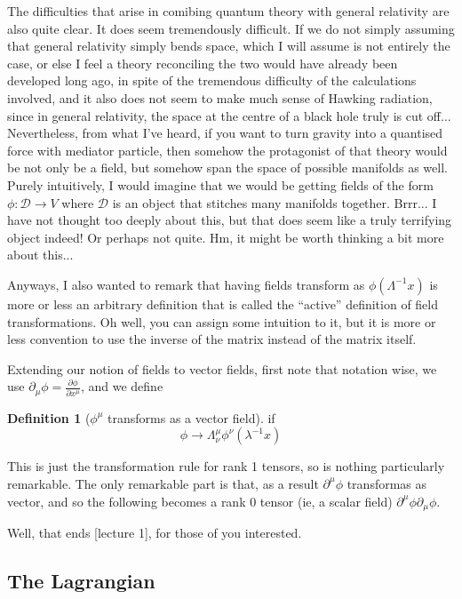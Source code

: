 \documentclass{article}
\theoremstyle{definition}
\newtheorem{definition}{Definition}
\begin{document}
The difficulties that arise in comibing quantum theory with general relativity
are also quite clear. It does seem tremendously difficult. If we do not simply
assuming that general relativity simply bends space, which I will assume is not
entirely the case, or else I feel a theory reconciling the two would have
already been developed long ago, in spite of the tremendous difficulty of the
calculations involved, and it also does not seem to make much sense of Hawking
radiation, since in general relativity, the space at the centre of a black hole
truly is cut off... Nevertheless, from what I've heard, if you want to turn
gravity into a quantised force with mediator particle, then somehow the
protagonist of that theory would be not only be a field, but somehow span the
space of possible manifolds as well. Purely intuitively, I would imagine that we
would be getting fields of the form $\phi : \mathcal{D} \to V$ where
$\mathcal{D}$ is an object that stitches many manifolds together. Brrr... I have
not thought too deeply about this, but that does seem like a truly terrifying
object indeed! Or perhaps not quite. Hm, it might be worth thinking a bit more
about this...

Anyways, I also wanted to remark that having fields transform as
$\phi(\Lambda^{-1}x)$ is more or less an arbitrary definition that is called the
``active'' definition of field transformations. Oh well, you can assign some
intuition to it, but it is more or less convention to use the inverse of the
matrix instead of the matrix itself.

Extending our notion of fields to vector fields, first note that notation wise,
we use $\partial_\mu \phi = \frac{\partial \phi}{\partial x^\mu}$, and we define

\begin{definition}[$\phi^\mu$ transforms as a vector field]
  if
  $$ \phi \to \Lambda^\mu_\nu \phi^\nu (\lambda^{-1} x) $$
\end{definition}

This is just the transformation rule for rank 1 tensors, so is nothing
particularly remarkable. The only remarkable part is that, as a result
$\partial^\mu \phi$ transformas as vector, and so the following becomes a rank 0
tensor (ie, a scalar field) $\partial^\mu \phi \partial_\mu \phi$.

Well, that ends [lecture 1], for those of you interested. 

\subsection{The Lagrangian}
\end{document}
